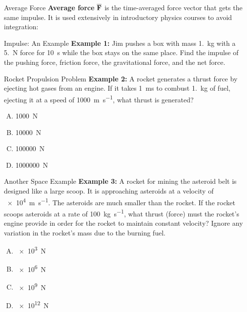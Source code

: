 \documentclass[12pt,compress,aspectratio=169]{beamer}
\newcommand{\mb}[1]{\ensuremath\mathbf{#1}}
\newcommand{\eq}[2]{\vspace{#1}{\Large\begin{displaymath}#2\end{displaymath}}}
\begin{document}
\begin{frame}{Average Force}
  \textbf{Average force} $\overline{\mb{F}}$ is the time-averaged force vector
  that gets the same impulse. It is used extensively in introductory physics
  courses to avoid integration:

  \eq{-.15in}{
    \mb{J}=\int_{t_1}^{t_2}\mb{F}dt=\overline{\mb{F}}\Delta t
  }
\end{frame}



\begin{frame}{Impulse: An Example}
  \textbf{Example 1:} Jim pushes a box with mass \SI{1.}{\kilo\gram} with a
  \SI{5.}{\newton} force for \SI{10}{\second} while the box stays on the same
  place. Find the impulse of the pushing force, friction force, the
  gravitational force, and the net force.
\end{frame}



\begin{frame}{Rocket Propulsion Problem}
  \textbf{Example 2:} A rocket generates a thrust force by ejecting hot gases
  from an engine. If it takes \SI{1}{\milli\second} to combust
  \SI{1.}{\kilo\gram} of fuel, ejecting it at a speed of
  \SI{1000}{\metre\per\second}, what thrust is generated?
  
  \vspace{.15in}\begin{enumerate}[A.]
  \item \SI{1000}{\newton}
  \item \SI{10000}{\newton}
  \item \SI{100000}{\newton}
  \item \SI{1000000}{\newton}
  \end{enumerate}
\end{frame}



\begin{frame}{Another Space Example}
  \textbf{Example 3:} A rocket for mining the asteroid belt is designed like a
  large scoop. It is approaching asteroids at a velocity of
  \SI{e4}{\metre\per\second}. The asteroids are much smaller than the rocket.
  If the rocket scoops asteroids at a rate of \SI{100}{\kilo\gram\per\second},
  what thrust (force) must the rocket's engine provide in order for the rocket
  to maintain constant velocity? Ignore any variation in the rocket's mass due
  to the burning fuel.

  \vspace{.15in}\begin{enumerate}[A.]
  \item\SI{e3}{\newton}
  \item\SI{e6}{\newton}
  \item\SI{e9}{\newton}
  \item\SI{e12}{\newton}
  \end{enumerate}
\end{frame}
\end{document}
